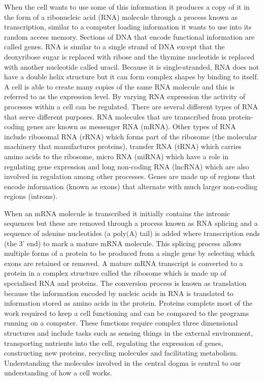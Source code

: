 \documentclass[11pt,a4paper,titlepage,twoside,openright]{style/unimelbthesis}
\theoremstyle{definition}
\theoremstyle{definition}
\theoremstyle{definition}
\theoremstyle{remark}
\begin{document}
\begin{mainmatter}
When the cell wants to use some of this information it produces a copy of it in the form of a ribonucleic acid (RNA) molecule through a process known as transcription, similar to a computer loading information it wants to use into its random access memory. Sections of DNA that encode functional information are called genes. RNA is similar to a single strand of DNA except that the deoxyribose sugar is replaced with ribose and the thymine nucleotide is replaced with another nucleotide called uracil. Because it is single-stranded, RNA does not have a double helix structure but it can form complex shapes by binding to itself. A cell is able to create many copies of the same RNA molecule and this is referred to as the expression level. By varying RNA expression the activity of processes within a cell can be regulated. There are several different types of RNA that serve different purposes. RNA molecules that are transcribed from protein-coding genes are known as messenger RNA (mRNA). Other types of RNA include ribosomal RNA (rRNA) which forms part of the ribosome (the molecular machinery that manufactures proteins), transfer RNA (tRNA) which carries amino acids to the ribosome, micro RNA (miRNA) which have a role in regulating gene expression and long non-coding RNA (lncRNA) which are also involved in regulation among other processes. Genes are made up of regions that encode information (known as exons) that alternate with much larger non-coding regions (introns).

When an mRNA molecule is transcribed it initially contains the intronic sequences but these are removed through a process known as RNA splicing and a sequence of adenine nucleotides (a poly(A) tail) is added where transcription ends (the 3' end) to mark a mature mRNA molecule. This splicing process allows multiple forms of a protein to be produced from a single gene by selecting which exons are retained or removed. A mature mRNA transcript is converted to a protein in a complex structure called the ribosome which is made up of specialised RNA and proteins. The conversion process is known as translation because the information encoded by nucleic acids in RNA is translated to information stored as amino acids in the protein. Proteins complete most of the work required to keep a cell functioning and can be compared to the programs running on a computer. These functions require complex three dimensional structures and include tasks such as sensing things in the external environment, transporting nutrients into the cell, regulating the expression of genes, constructing new proteins, recycling molecules and facilitating metabolism. Understanding the molecules involved in the central dogma is central to our understanding of how a cell works.


\end{mainmatter}
\end{document}
